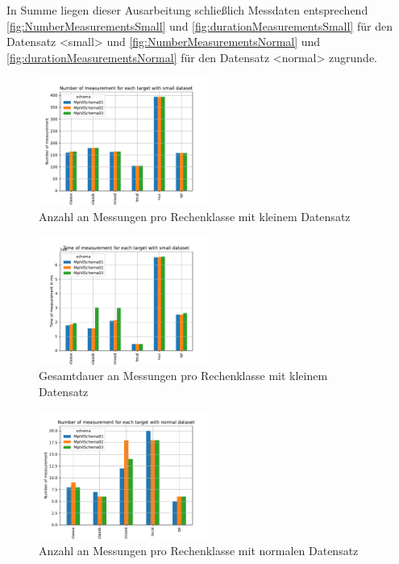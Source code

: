 In Summe liegen dieser Ausarbeitung schließlich Messdaten entsprechend \autoref{fig:NumberMeasurementsSmall} und \autoref{fig:durationMeasurementsSmall} für den Datensatz <small> und \autoref{fig:NumberMeasurementsNormal} und \autoref{fig:durationMeasurementsNormal} für den Datensatz <normal> zugrunde.

\begin{figure}[h]
	\includegraphics[width=0.5\textwidth]{./gen/img/ds/small/number_measurement_target.pdf}
	\caption{Anzahl an Messungen pro Rechenklasse mit kleinem Datensatz}
	\label{fig:NumberMeasurementsSmall}
\end{figure}

\begin{figure}[h]
	\includegraphics[width=0.5\textwidth]{./gen/img/ds/small/runtime_measurement_target.pdf}
	\caption{Gesamtdauer an Messungen pro Rechenklasse mit kleinem Datensatz}
	\label{fig:durationMeasurementsSmall}
\end{figure}

\begin{figure}[h]
	\includegraphics[width=0.5\textwidth]{../gen/img/ds/normal/number_measurement_target.pdf}
	\caption{Anzahl an Messungen pro Rechenklasse mit normalen Datensatz}
	\label{fig:NumberMeasurementsNormal}
\end{figure}


